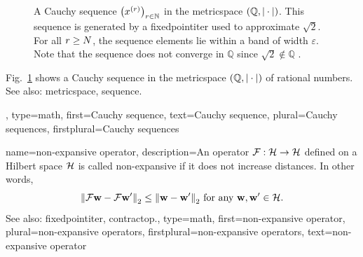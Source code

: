 {{\begin{figure}
\begin{tikzpicture}[x=1cm,y=4cm]
			\end{tikzpicture}
			\caption{A Cauchy \gls{sequence} 
			$\big(\feature^{(\sampleidx)}\big)_{\sampleidx\in\mathbb{N}}$ 
			in the \gls{metricspace} $\pair{\mathbb{Q}}{|\cdot|}$. 
			This \gls{sequence} is generated by a \gls{fixedpointiter} used to approximate 
			$\sqrt{2}$.  For all $\sampleidx \ge N$, 
			the \gls{sequence} elements lie within a band of width $\varepsilon$. 
			Note that the \gls{sequence} does not converge in $\mathbb{Q}$ 
			since $\sqrt{2} \notin \mathbb{Q}$ \cite[Example 1.1.]{RudinBookPrinciplesMatheAnalysis}.\label{fig:fpit_cauchy_sqrt2_dict}}
			\end{figure}
		   Fig.\ \ref{fig:fpit_cauchy_sqrt2_dict} shows a Cauchy sequence in the \gls{metricspace} $\pair{\mathbb{Q}}{|\cdot|}$ of 
		   rational numbers.  \\ 
		  See also: \gls{metricspace}, \gls{sequence}. }, 
		type=math,
		first={Cauchy sequence},
		text={Cauchy sequence},
		plural={Cauchy sequences},
		firstplural={Cauchy sequences}
}

 {name={non-expansive operator},
 	description={An  operator 
	$\fixedpointop: \hilbertspace \rightarrow \hilbertspace$ defined on a 
	Hilbert space $\hilbertspace$ is called non-expansive if it does 
	not increase distances. 
	In other words,  
 		\begin{equation} 
 			\nonumber
 			\normgeneric{ \fixedpointop \weights - \fixedpointop \weights'}{2} 
			\leq 	\normgeneric{\weights - \weights'}{2} \mbox{ for any } \weights, \weights' \in \hilbertspace. 
 		\end{equation} 
 		See also: \gls{fixedpointiter}, \gls{contractop}.},
 	type=math, 
	first={non-expansive operator},
 	plural={non-expansive operators},
	firstplural={non-expansive operators},
 	text={non-expansive operator}
 }

